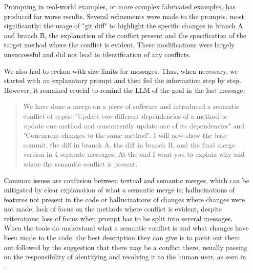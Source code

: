Prompting in real-world examples, or more complex fabricated examples, has produced far worse results. Several refinements were made to the prompts, most significantly: the usage of "git diff" to highlight the specific changes in branch A and branch B, the explanation of the conflict present and the specification of the target method where the conflict is evident. These modifications were largely unsuccessful and did not lead to identification of any conflicts.

We also had to reckon with size limits for messages. Thus, when necessary, we started with an explanatory prompt and then fed the information step by step. However, it remained crucial to remind the LLM of the goal in the last message.

\begin{quote}
We have done a merge on a piece of software and introduced a semantic conflict of types: "Update two different dependencies of a method or update one method and concurrently update one of its dependencies" and "Concurrent changes to the same method". I will now show the base commit, the diff in branch A, the diff in branch B, and the final merge version in 4 separate messages. At the end I want you to explain why and where the semantic conflict is present.
\end{quote}

Common issues are confusion between textual and semantic merges, which can be mitigated by clear explanation of what a semantic merge is; hallucinations of features not present in the code or hallucinations of changes where changes were not made; lack of focus on the methods where conflict is evident, despite reiterations; loss of focus when prompt has to be split into several messages. When the tools do understand what a semantic conflict is and what changes have been made to the code, the best description they can give is to point out them out followed by the suggestion that there may be a conflict there, usually passing on the responsibility of identifying and resolving it to the human user, as seen in .

